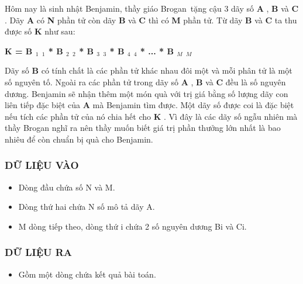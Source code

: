 



   Hôm nay là sinh nhật Benjamin, thầy giáo Brogan tặng cậu 3 dãy số   \textbf{    A   }   ,   \textbf{    B   }   và   \textbf{    C   }   . Dãy   \textbf{    A   }   có   \textbf{    N   }   phần tử còn dãy   \textbf{    B   }   và   \textbf{    C   }   thì có   \textbf{    M   }   phần tử. Từ dãy   \textbf{    B   }   và   \textbf{    C   }   ta thu được số   \textbf{    K   }   như sau:  

\textbf{    K = B    $_     1    $    \textasciicircumC    $_     1    $    * B    $_     2    $    \textasciicircumC    $_     2    $    * B    $_     3    $    \textasciicircumC    $_     3    $    * B    $_     4    $    \textasciicircumC    $_     4    $    * ... * B    $_     M    $    \textasciicircumC    $_     M    $}

   Dãy số   \textbf{    B   }   có tính chất là các phần tử khác nhau đôi một và mỗi phân tử là một số nguyên tố. Ngoài ra các phần tử trong dãy số   \textbf{    A   }   ,   \textbf{    B   }   và   \textbf{    C   }   đều là số nguyên dương. Benjamin sẽ nhận thêm một món quà với trị giá bằng số lượng dãy con liên tiếp đặc biệt của   \textbf{    A   }   mà Benjamin tìm được. Một dãy số được coi là đặc biệt nếu tích các phần tử của nó chia hết cho   \textbf{    K   }   . Vì đây là các dãy số ngẫu nhiên mà thầy Brogan nghĩ ra nên thầy muốn biết giá trị phần thưởng lớn nhất là bao nhiêu để còn chuẩn bị quà cho Benjamin.  

\subsubsection{   DỮ LIỆU VÀO  }


\begin{itemize}
	\item     Dòng đầu chứa số N và M.   
	\item     Dòng thứ hai chứa N số mô tả dãy A.   
	\item     M dòng tiếp theo, dòng thứ i chứa 2 số nguyên dương Bi và Ci.   
\end{itemize}



\subsubsection{   DỮ LIỆU RA  }
\begin{itemize}
	\item     Gồm một dòng chứa kết quả bài toán.   
\end{itemize}

